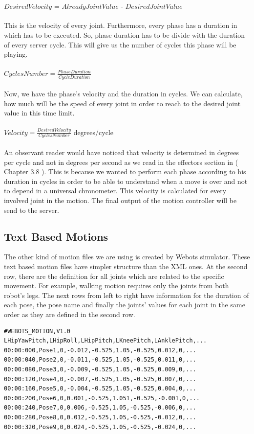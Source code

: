 \\
\\
$Desired Velocity$ = $Already Joint Value$ - $Desired Joint Value$\\
\\
This is the velocity of every joint. Furthermore, every phase has a duration in which has to be executed. So, phase duration has to be divide with the duration of every server cycle. This will give us the number of cycles this phase will be playing.\\
\\
$Cycles Number = \frac {Phase Duration} {Cycle Duration}$\\
\\
Now, we have the phase's velocity and the duration in cycles. We can calculate, how much will be the speed of every joint in order to reach to the desired joint value in this time limit.\\
\\
$Velocity = \frac {Desired Velocity} {Cycles Number} $ degrees/cycle \\
\\
An observant reader would have noticed that velocity is determined in degrees per cycle and not in degrees per second as we read in the effectors section in ( Chapter 3.8 ). This is because we wanted to perform each phase according to his duration in cycles in order to be able to understand when a move is over and not to depend in a universal chronometer.
This velocity is calculated for every involved joint in the motion. The final output of the motion controller will be send to the server.



\subsection{Text Based Motions}
The other kind of motion files we are using is created by Webots simulator. These text based motion files have simpler structure than the XML ones. At the second row, there are the definition for all joints which are related to the specific movement. For example, walking motion requires only the joints from both robot's legs. The next rows from left to right have information for the duration of each pose, the pose name and finally the joints' values for each joint in the same order as they are defined in the second row.
\begin{verbatim}
#WEBOTS_MOTION,V1.0
LHipYawPitch,LHipRoll,LHipPitch,LKneePitch,LAnklePitch,...
00:00:000,Pose1,0,-0.012,-0.525,1.05,-0.525,0.012,0,...
00:00:040,Pose2,0,-0.011,-0.525,1.05,-0.525,0.011,0,...
00:00:080,Pose3,0,-0.009,-0.525,1.05,-0.525,0.009,0,...
00:00:120,Pose4,0,-0.007,-0.525,1.05,-0.525,0.007,0,...
00:00:160,Pose5,0,-0.004,-0.525,1.05,-0.525,0.004,0,...
00:00:200,Pose6,0,0.001,-0.525,1.051,-0.525,-0.001,0,...
00:00:240,Pose7,0,0.006,-0.525,1.05,-0.525,-0.006,0,...
00:00:280,Pose8,0,0.012,-0.525,1.05,-0.525,-0.012,0,...
00:00:320,Pose9,0,0.024,-0.525,1.05,-0.525,-0.024,0,...
\end{verbatim}

